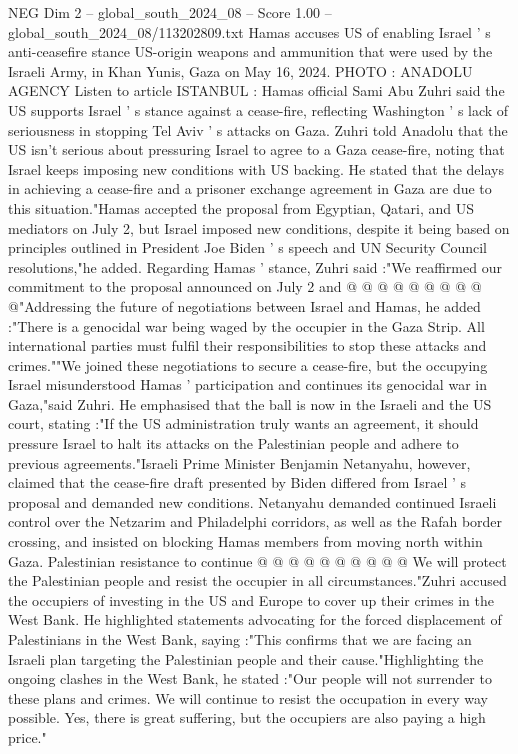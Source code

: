 \begin{textsample}{NEG Dim 2 – global\_south\_2024\_08 – Score 1.00 – global\_south\_2024\_08/113202809.txt}  \label{ex:f2_neg_111}
Hamas accuses US of enabling Israel ' s anti-ceasefire stance US-origin weapons and ammunition that were used by the Israeli Army, in Khan Yunis, Gaza on May 16, 2024.
PHOTO : ANADOLU AGENCY Listen to article ISTANBUL : Hamas official Sami Abu Zuhri said the US supports Israel ' s stance against a cease-fire, reflecting Washington ' s lack of seriousness in stopping Tel Aviv ' s attacks on Gaza.
Zuhri told Anadolu that the US isn't serious about pressuring Israel to agree to a Gaza cease-fire, noting that Israel keeps imposing new conditions with US backing.
He stated that the delays in achieving a cease-fire and a prisoner exchange agreement in Gaza are due to this situation."Hamas accepted the proposal from Egyptian, Qatari, and US mediators on July 2, but Israel imposed new conditions, despite it being based on principles outlined in President Joe Biden ' s speech and UN Security Council resolutions,"he added.
Regarding Hamas ' stance, Zuhri said :"We reaffirmed our commitment to the proposal announced on July 2 and @ @ @ @ @ @ @ @ @ @"Addressing the future of negotiations between Israel and Hamas, he added :"There is a genocidal war being waged by the occupier in the Gaza Strip.
All international parties must fulfil their responsibilities to stop these attacks and crimes.""We joined these negotiations to secure a cease-fire, but the occupying Israel misunderstood Hamas ' participation and continues its genocidal war in Gaza,"said Zuhri.
He emphasised that the ball is now in the Israeli and the US court, stating :"If the US administration truly wants an agreement, it should pressure Israel to halt its attacks on the Palestinian people and adhere to previous agreements."Israeli Prime Minister Benjamin Netanyahu, however, claimed that the cease-fire draft presented by Biden differed from Israel ' s proposal and demanded new conditions.
Netanyahu demanded continued Israeli control over the Netzarim and Philadelphi corridors, as well as the Rafah border crossing, and insisted on blocking Hamas members from moving north within Gaza.
Palestinian resistance to continue @ @ @ @ @ @ @ @ @ @ We will protect the Palestinian people and resist the occupier in all circumstances."Zuhri accused the occupiers of investing in the US and Europe to cover up their crimes in the West Bank.
He highlighted statements advocating for the forced displacement of Palestinians in the West Bank, saying :"This confirms that we are facing an Israeli plan targeting the Palestinian people and their cause."Highlighting the ongoing clashes in the West Bank, he stated :"Our people will not surrender to these plans and crimes.
We will continue to resist the occupation in every way possible.
Yes, there is great suffering, but the occupiers are also paying a high price."

\end{textsample}
